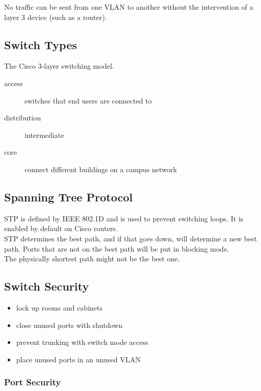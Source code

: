 No traffic can be sent from one VLAN to another without the intervention of
a layer 3 device (such as a router).

\subsection{Switch Types}

The Cisco 3-layer switching model.

\begin{description}

\item[access]
switches that end users are connected to

\item[distribution]
intermediate

\item[core]
connect different buildings on a campus network

\end{description}

\subsection{Spanning Tree Protocol}

STP is defined by IEEE 802.1D and is used to prevent switching loops. It is
enabled by default on Cisco routers.\\

STP determines the best path, and if that goes down, will determine a new best
path. Ports that are not on the best path will be put in blocking mode.\\

The physically shortest path might not be the best one.

\subsection{Switch Security}

\begin{itemize}

\item lock up rooms and cabinets
\item close unused ports with shutdown
\item prevent trunking with switch mode access
\item place unused ports in an unused VLAN

\end{itemize}

\subsubsection{Port Security}

